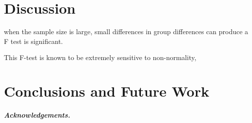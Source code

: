 \documentclass[a4paper,UKenglish]{lipics-v2016}
\begin{document}
\section{Discussion}
\label{sec:discussion}
when the sample size is large, small differences in group differences can produce a F test is significant. 

This F-test is known to be extremely sensitive to non-normality,


\section{Conclusions and Future Work}
\label{sec:conclusions}
%
%
%
%




\subparagraph*{Acknowledgements.}






\end{document}
